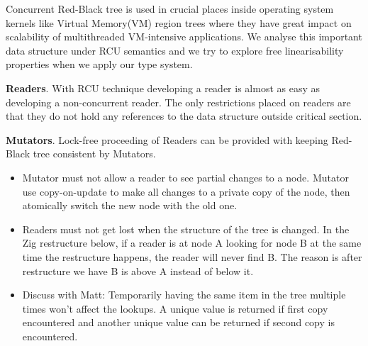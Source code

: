 Concurrent Red-Black tree is used in crucial places inside operating system kernels like Virtual Memory(VM) region trees where they have great impact on scalability of multithreaded VM-intensive applications.  We analyse this important data
structure under RCU semantics and we try to explore free linearisability properties when we apply our type system. 

\textsf{\textbf{Readers}}. With RCU technique developing a reader is almost as easy as developing a non-concurrent reader.  The only restrictions placed on readers are that they do not hold any references to the data structure outside critical section.


\textsf{\textbf{Mutators}}. Lock-free proceeding of \textsf{Readers} can be provided with keeping Red-Black tree consistent by \textsf{Mutators}. 
\begin{itemize}
\item Mutator must not allow a reader to see partial changes to a node. Mutator use copy-on-update to make all changes to a private copy of the node, then atomically switch the new node with the old one.
\item Readers must not get lost when the structure of the tree is changed. In the Zig restructure below, if a reader is at node \textsf{A} looking for node \textsf{B} at the same time the restructure happens, the reader will never find \textsf{B}. The reason is after restructure
	we have \textsf{B} is above \textsf{A} instead of below it. 
\item Discuss with Matt: Temporarily having the same item in the tree multiple times won't affect the lookups. A unique value is returned if first copy encountered and another unique value can be returned if second copy is encountered.
\end{itemize}

